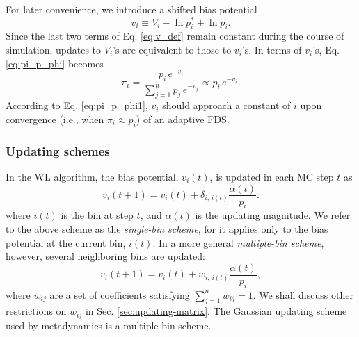 \documentclass[reprint, floatfix]{revtex4-1}
\begin{document}
For later convenience, we introduce a shifted bias potential
%
\begin{equation}
  v_i \equiv V_i - \ln p^*_i + \ln p_i.
  \label{eq:v_def}
\end{equation}
%
Since the last two terms of Eq. \eqref{eq:v_def}
remain constant during the course of simulation,
updates to $V_i$'s are equivalent to those to $v_i$'s.
%
In terms of $v_i$'s, Eq. \eqref{eq:pi_p_phi}
becomes
%
\begin{equation}
  \pi_i
  =
  \frac{                p_i \, e^{-v_i} }
       { \sum_{j = 1}^n p_j \, e^{-v_j} }
  \propto
  p_i \, e^{-v_i}.
  \label{eq:pi_p_v}
\end{equation}
%
According to Eq. \eqref{eq:pi_p_phi1},
$v_i$ should approach a constant of $i$
upon convergence (i.e., when $\pi_i \approx p_i$)
of an adaptive FDS.




\subsubsection{Updating schemes}



In the WL algorithm\cite{wang2001, wang2001pre},
the bias potential, $v_i(t)$, is updated
in each MC step $t$ as
%
\begin{equation}
  v_i(t+1)
  =
  v_i(t)
  +
  \delta_{i, \, i(t)}
  \frac{ \alpha(t) } { p_i }.
  \label{eq:wl_update}
\end{equation}
%
where $i(t)$ is the bin at step $t$,
and $\alpha(t)$ is the updating magnitude.
%
We refer to the above scheme as the \emph{single-bin scheme},
for it applies only to the bias potential
at the current bin, $i(t)$.
%
In a more general \emph{multiple-bin scheme}, however,
several neighboring bins are updated:
%
\begin{equation}
  v_i(t+1)
  =
  v_i(t)
  +
  w_{i, \, i(t)}
  \frac{ \alpha(t) } { p_i },
  \label{eq:mbin_update}
\end{equation}
%
where $w_{ij}$ are a set of coefficients satisfying
$\sum_{j=1}^n w_{ij} = 1$.
%
We shall discuss other restrictions on $w_{ij}$
in Sec. \ref{sec:updating-matrix}.
%
The Gaussian updating scheme
used by metadynamics
is a multiple-bin scheme.
\end{document}
